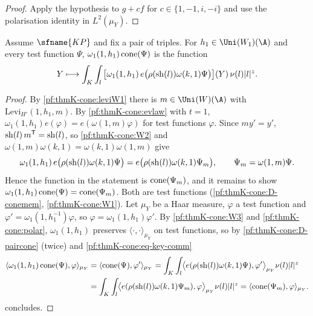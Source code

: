 \begin{proof}
Apply the hypothesis to $g+cf$ for $c\in\{1,-1,i,-i\}$ and use the polarisation identity in $L^2(\mu_Y)$.
\end{proof}

\begin{lemma}\label{pf:thmK-cone:conecomm}
Assume $\sfname{KP}$ and fix a pair of triples.  For $h_1\in\Uni(W_1)(\A)$ and every test function $\Psi$,
$\omega_1(1,h_1)\operatorname{cone}(\Psi)$ is the function
\[
  Y\longmapsto\int_K\int_l\,\bigl[\omega_1(1,h_1)\,e\bigl(\rho(\operatorname{sh}(l))\omega(k,1)\Psi\bigr)\bigr](Y)\,\nu(l)|l|^z .
\]
\end{lemma}

\begin{proof}
By \cref{pf:thmK-cone:leviW1} there is $m\in\Uni(W)(\A)$ with $\mathrm{Levi}_{H'}(1,h_1,m)$.  By \cref{pf:thmK-cone:evlaw}
with $t=1$, $\omega_1(1,h_1)e(\varphi)=e(\omega(1,m)\varphi)$ for test functions $\varphi$.  Since $my'=y'$,
$\operatorname{sh}(l)\,m^{\mathsf T}=\operatorname{sh}(l)$, so \ref{pf:thmK-cone:W2} and $\omega(1,m)\omega(k,1)=\omega(k,1)\omega(1,m)$
give
\begin{equation}\label{pf:thmK-cone:eq-key-comm}
  \omega_1(1,h_1)\,e\bigl(\rho(\operatorname{sh}(l))\omega(k,1)\Psi\bigr)=e\bigl(\rho(\operatorname{sh}(l))\omega(k,1)\Psi_m\bigr),
  \qquad\Psi_m=\omega(1,m)\Psi .
\end{equation}
Hence the function in the statement is $\operatorname{cone}(\Psi_m)$, and it remains to show
$\omega_1(1,h_1)\operatorname{cone}(\Psi)=\operatorname{cone}(\Psi_m)$.  Both are test functions (\ref{pf:thmK-cone:D-conemem},
\ref{pf:thmK-cone:W1}).  Let $\mu_Y$ be a Haar measure, $\varphi$ a test function and $\varphi'=\omega_1(1,h_1^{-1})\varphi$, so
$\varphi=\omega_1(1,h_1)\varphi'$.  By \ref{pf:thmK-cone:W3} and \cref{pf:thmK-cone:polar}, $\omega_1(1,h_1)$ preserves
$\langle\cdot,\cdot\rangle_{\mu_Y}$ on test functions, so by \ref{pf:thmK-cone:D-paircone} (twice) and
\eqref{pf:thmK-cone:eq-key-comm}
\begin{align*}
  \langle\omega_1(1,h_1)\operatorname{cone}(\Psi),\varphi\rangle_{\mu_Y}
  &=\langle\operatorname{cone}(\Psi),\varphi'\rangle_{\mu_Y}
   =\int_K\int_l\bigl\langle e(\rho(\operatorname{sh}(l))\omega(k,1)\Psi),\varphi'\bigr\rangle_{\mu_Y}\nu(l)|l|^z\\
  &=\int_K\int_l\bigl\langle e(\rho(\operatorname{sh}(l))\omega(k,1)\Psi_m),\varphi\bigr\rangle_{\mu_Y}\nu(l)|l|^z
   =\langle\operatorname{cone}(\Psi_m),\varphi\rangle_{\mu_Y}.
\end{align*}
 concludes.
\end{proof}


